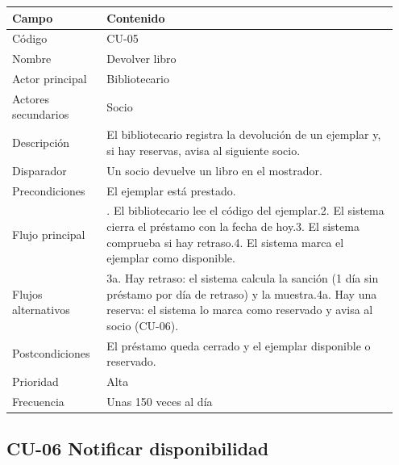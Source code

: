 \documentclass[11pt,a4paper]{article}
\begin{document}
{\small
\begin{longtable}{@{}>{\raggedright\arraybackslash}p{0.232\linewidth}>{\raggedright\arraybackslash}p{0.717\linewidth}@{}}
\toprule
\textbf{Campo} & \textbf{Contenido} \\
\midrule
\endhead
Código & CU-05 \\
Nombre & Devolver libro \\
Actor principal & Bibliotecario \\
Actores secundarios & Socio \\
Descripción & El bibliotecario registra la devolución de un ejemplar y, si hay reservas, avisa al siguiente socio. \\
Disparador & Un socio devuelve un libro en el mostrador. \\
Precondiciones & El ejemplar está prestado. \\
Flujo principal & 1. El bibliotecario lee el código del ejemplar.\newline{}2. El sistema cierra el préstamo con la fecha de hoy.\newline{}3. El sistema comprueba si hay retraso.\newline{}4. El sistema marca el ejemplar como disponible. \\
Flujos alternativos & 3a. Hay retraso: el sistema calcula la sanción (1 día sin préstamo por día de retraso) y la muestra.\newline{}4a. Hay una reserva: el sistema lo marca como reservado y avisa al socio (CU-06). \\
Postcondiciones & El préstamo queda cerrado y el ejemplar disponible o reservado. \\
Prioridad & Alta \\
Frecuencia & Unas 150 veces al día \\
\bottomrule
\end{longtable}}

\subsection*{CU-06 Notificar disponibilidad}
\end{document}
